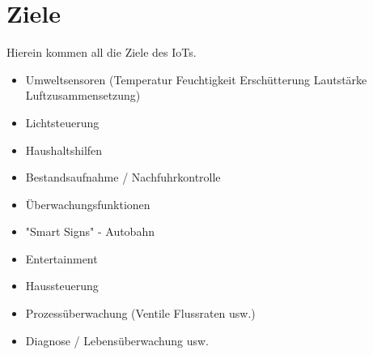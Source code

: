 \section{Ziele}\label{s:IoTZiele}

Hierein kommen all die Ziele des IoTs.

\begin{itemize} 
\item Umweltsensoren (Temperatur Feuchtigkeit Erschütterung Lautstärke Luftzusammensetzung) 
\item Lichtsteuerung
\item Haushaltshilfen
\item Bestandsaufnahme / Nachfuhrkontrolle
\item Überwachungsfunktionen
\item "Smart Signs" - Autobahn
\item Entertainment
\item Haussteuerung
\item Prozessüberwachung (Ventile Flussraten usw.)
\item Diagnose / Lebensüberwachung usw.
\end{itemize}